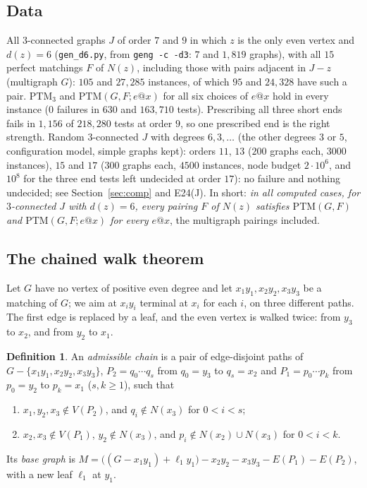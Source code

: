 \documentclass[11pt]{amsart}
\theoremstyle{definition}
\newtheorem{definition}[theorem]{Definition}
\newcommand{\PTM}{\mathrm{PTM}}
\begin{document}
\subsection*{Data}
All $3$-connected graphs $J$ of order $7$ and $9$ in which $z$ is the only even vertex and
$d(z)=6$ (\texttt{gen\_d6.py}, from \texttt{geng -c -d3}: $7$ and $1{,}819$ graphs), with all
$15$ perfect matchings $F$ of $N(z)$, including those with pairs adjacent in $J-z$ (multigraph
$G$): $105$ and $27{,}285$ instances, of which $95$ and $24{,}328$ have such a pair. $\PTM_3$ and
$\PTM(G,F;e@x)$ for all six choices of $e@x$ hold in every instance ($0$ failures in $630$ and
$163{,}710$ tests). Prescribing all three short ends fails in $1{,}156$ of $218{,}280$ tests at
order $9$, so one prescribed end is the right strength. Random $3$-connected $J$ with degrees
$6,3,\dots$ (the other degrees $3$ or $5$, configuration model, simple graphs kept): orders $11$,
$13$ ($200$ graphs each, $3000$ instances), $15$ and $17$ ($300$ graphs each, $4500$ instances,
node budget $2\cdot10^6$, and $10^8$ for the three end tests left undecided at order $17$): no
failure and nothing undecided; see Section~\ref{sec:comp} and
E24(J). In short: \emph{in all computed cases, for $3$-connected $J$ with $d(z)=6$, every pairing
$F$ of $N(z)$ satisfies $\PTM(G,F)$ and $\PTM(G,F;e@x)$ for every $e@x$}, the multigraph pairings
included.

\subsection*{The chained walk theorem}
Let $G$ have no vertex of positive even degree and let $x_1y_1,x_2y_2,x_3y_3$ be a matching of
$G$; we aim at $x_iy_i$ terminal at $x_i$ for each $i$, on three different paths. The first edge
is replaced by a leaf, and the even vertex is walked twice: from $y_3$ to $x_2$, and from $y_2$
to $x_1$.

\begin{definition}\label{def:chain}
An \emph{admissible chain} is a pair of edge-disjoint paths of $G-\{x_1y_1,x_2y_2,x_3y_3\}$,
$P_2=q_0\cdots q_s$ from $q_0=y_3$ to $q_s=x_2$ and $P_1=p_0\cdots p_k$ from $p_0=y_2$ to
$p_k=x_1$ ($s,k\ge1$), such that
\begin{enumerate}[label=\textup{(\roman*)}]
\item $x_1,y_2,x_3\notin V(P_2)$, and $q_i\notin N(x_3)$ for $0<i<s$;
\item $x_2,x_3\notin V(P_1)$, $y_2\notin N(x_3)$, and $p_i\notin N(x_2)\cup N(x_3)$ for
$0<i<k$.
\end{enumerate}
Its \emph{base graph} is
$M=\bigl((G-x_1y_1)+\ell_1y_1\bigr)-x_2y_2-x_3y_3-E(P_1)-E(P_2)$, with a new leaf $\ell_1$ at $y_1$.
\end{definition}
\end{document}
